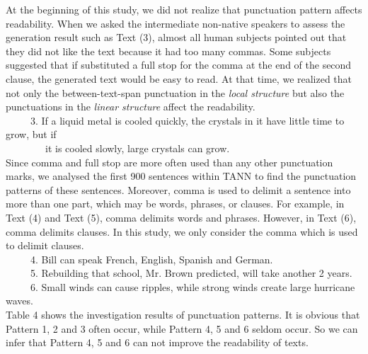 \documentclass[english]{jnlp_1.2.0}
\begin{document}
At the beginning of this study, we did not realize that 
punctuation pattern affects readability. When we asked the intermediate non-native 
speakers to assess the generation result such as Text (3), almost 
all human subjects pointed out that they did not like the text
because it had too many commas. Some subjects suggested that 
if substituted a full stop for the comma at the 
end of the second clause, the generated text would be easy to read. 
At that time, we realized that not only the between-text-span 
punctuation in the \textit{local structure} but also the punctuations 
in the \textit{linear structure} affect the readability. 
~\\
~~~~~3. If a liquid metal is cooled quickly, the crystals in it have little time to grow, but if\\
~~~~~~~~it is cooled slowly, large crystals can grow.
~\\
Since comma and full stop are more often used than any other punctuation
marks, we analysed the first 900 sentences within TANN to find the punctuation
patterns of these sentences. Moreover, comma is used to delimit a sentence into more 
than one part, which may be words, phrases, or clauses. 
For example, in Text (4) and Text (5), comma delimits words and 
phrases. However, in Text (6), comma delimits clauses. In this study, 
we only consider the comma which is used to delimit clauses. 
~\\
~~~~~4. Bill can speak French, English, Spanish and German.\\
~~~~~5. Rebuilding that school, Mr. Brown predicted, will take another 2 years.\\
~~~~~6. Small winds can cause ripples, while strong winds create large hurricane waves. 
~\\
Table 4 shows the investigation results of punctuation patterns. 
It is obvious that Pattern 1, 2 and 3 often occur, while Pattern 4, 
5 and 6 seldom occur. So we can infer that Pattern 4, 5 and 6 can not 
improve the readability of texts.
\end{document}
